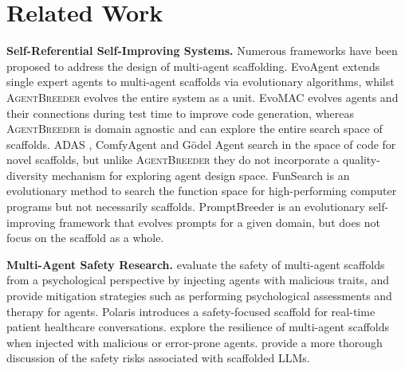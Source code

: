 \section{Related Work}
\label{relatedwork}

\textbf{Self-Referential Self-Improving Systems.} Numerous frameworks \citep{yuan2024evoagent, evomac, adas, comfybench, godel} have been proposed to address the design of multi-agent scaffolding. EvoAgent \citep{yuan2024evoagent} extends single expert agents to multi-agent scaffolds via evolutionary algorithms, whilst \textsc{AgentBreeder} evolves the entire system as a unit. EvoMAC \citep{evomac} evolves agents and their connections during test time to improve code generation, whereas \textsc{AgentBreeder} is domain agnostic and can explore the entire search space of scaffolds. ADAS \citep{adas}, ComfyAgent \citep{comfybench} and Gödel Agent \citep{godel} search in the space of code for novel scaffolds, but unlike \textsc{AgentBreeder} they do not incorporate a quality-diversity mechanism for exploring agent design space. FunSearch \citep{funsearch} is an evolutionary method to search the function space for high-performing computer programs but not necessarily scaffolds. PromptBreeder \citep{promptbreeder} is an evolutionary self-improving framework that evolves prompts for a given domain, but does not focus on the scaffold as a whole.

\textbf{Multi-Agent Safety Research.} \citet{psysafe} evaluate the safety of multi-agent scaffolds from a psychological perspective by injecting agents with malicious traits, and provide mitigation strategies such as performing psychological assessments and therapy for agents. Polaris \citep{polaris} introduces a safety-focused scaffold for real-time patient healthcare conversations.
\citet{maliciouserrormultiagentsystems} explore the resilience of multi-agent scaffolds when injected with malicious or error-prone agents. \citet{scaffoldedllms} provide a more thorough discussion of the safety risks associated with scaffolded LLMs.